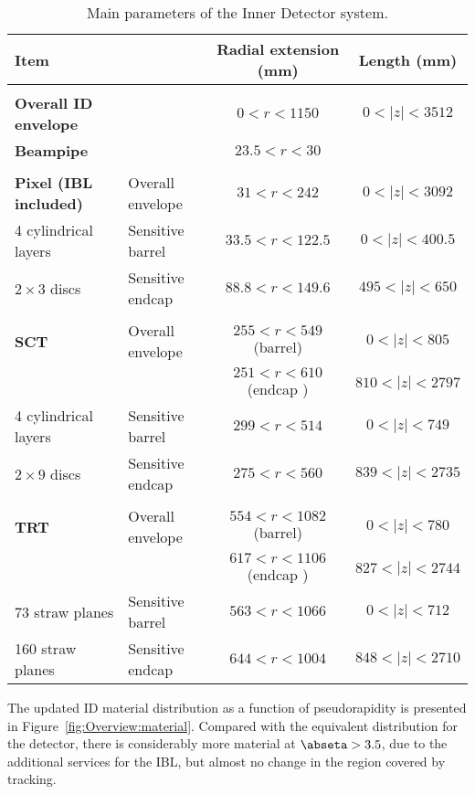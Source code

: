 \documentclass[cernpreprint, atlasdraft=false, UKenglish,british,orcidlogo, texmf, orcidlogo]{atlasdoc}
\begin{document}
\begin{table}[htbp]
 
\begin{center}
\caption{Main parameters of the Inner Detector system.}
\label{tab:IDpara}
\begin{tabular}{| l l | c | c |}
\hline
\textbf{Item} & & \textbf{Radial extension (\si{\mm})} &\textbf{Length (\si{\mm})}\\[2pt] \hline
& & & \\
\textbf{Overall \gls{ID} envelope}  &                      & $0<r<1150$           & $0<|z|<3512$ \\
\textbf{Beampipe}                &                       & $ 23.5 <r<30$        & \\
& & & \\ \hline
\textbf{\gls{Pixel} (\gls{IBL} included) }               & Overall envelope    & $ 31 <r<242$            & $0<|z|<3092$\\
4 cylindrical layers       & Sensitive barrel      & $33.5<r<122.5$        & $0<|z|<400.5$\\
$2\times 3$ discs         & Sensitive endcap   & $88.8<r<149.6$            & $495<|z|<650$\\
& & & \\
\textbf{\gls{SCT}}                & Overall envelope   &$255<r<549$ (barrel)  &$0<|z|<805$\\
&                    &$251<r<610$ (endcap )&$810<|z|<2797$\\
4 cylindrical layers       &Sensitive barrel    &$299<r<514$           &$0<|z|<749$\\
$2 \times 9$ discs         &Sensitive endcap  &$275<r<560$           &$839<|z|<2735$\\
& & & \\
\textbf{\gls{TRT}}                  & Overall envelope  & $554<r<1082$ (barrel)    & $0<|z|<780$\\
&                              & $617<r<1106$ (endcap ) & $827<|z|<2744$ \\
73 straw planes            &Sensitive barrel      & $563<r<1066$                & $0<|z|<712$\\
160 straw planes           &Sensitive endcap  & $644<r<1004$                & $848<|z|<2710$\\
\hline
\end{tabular}
\end{center}
\end{table}
 
The updated \gls{ID} material distribution as a function of pseudorapidity is presented in Figure~\ref{fig:Overview:material}.
Compared with the equivalent distribution for the \RunOne detector, there is considerably more material at \(\abseta > 3.5\), due to the additional services for the \gls{IBL}, but almost no change in the region covered by tracking.
 
\end{document}
